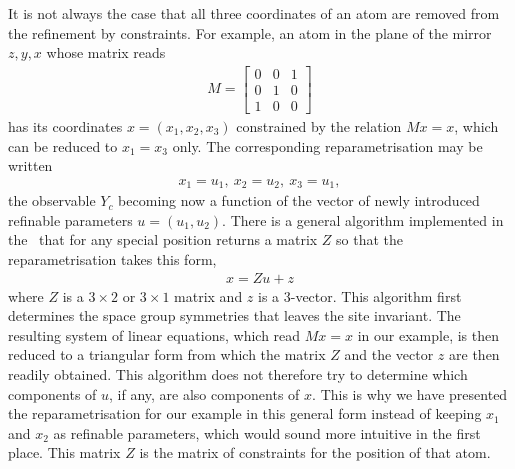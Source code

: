 \documentclass[11pt]{article}
\begin{document}
It is not always the case that all three coordinates of an atom are removed from the refinement by constraints. For example, an atom in the plane of the mirror $z,y,x$ whose matrix reads
\begin{align}
M=\begin{bmatrix}
0 & 0 & 1\\
0 & 1 & 0\\
1 & 0 & 0
\end{bmatrix}
\end{align}
has its coordinates $x=(x_1, x_2, x_3)$ constrained by the relation $M x = x$, which can be reduced to $x_1 = x_3$ only. The corresponding reparametrisation may be written
\begin{align}
x_1 = u_1,\ x_2 = u_2,\ x_3 = u_1,
\label{eqn:specialposexamplereparam}
\end{align}
the observable $Y_c$ becoming now a function of the vector of newly introduced refinable parameters $u = (u_1, u_2)$. There is a general algorithm implemented in the \cctbx\ that for any special position returns a matrix $Z$ so that the reparametrisation takes this form,
\begin{align}
x = Z u + z
\end{align}
where $Z$ is a $3 \times 2$ or $3 \times 1$ matrix and $z$ is a 3-vector. This algorithm first determines the space group symmetries that leaves the site invariant. The resulting system of linear equations, which read $M x = x$ in our example, is then reduced to a triangular form from which the matrix $Z$ and the vector $z$ are then readily obtained. This algorithm does not therefore try to determine which components of $u$, if any, are also components of $x$. This is why we have presented the reparametrisation for our example in this general form instead of keeping $x_1$ and $x_2$ as refinable parameters, which would sound more intuitive in the first place.
This matrix $Z$ is the matrix of constraints for the position of that atom.
\end{document}
